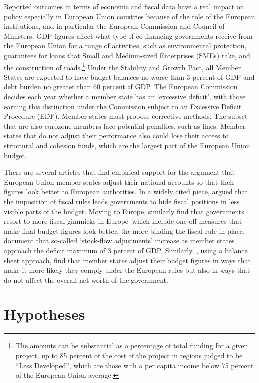 \documentclass[]{article}
\begin{document}
Reported outcomes in terms of economic and fiscal data have a real impact on policy especially in European Union countries because of the role of the European institutions, and in particular the European Commission and Council of Ministers. GDP figures affect what type of co-financing governments receive from the European Union for a range of activities, such as environmental protection, guarantees for loans that Small and Medium-sized Enterprises (SMEs) take, and the construction of roads.\footnote{The amounts can be substantial as a percentage of total funding for a given project, up to 85 percent of the cost of the project in regions judged to be “Less Developed”, which are those with a per capita income below 75 percent of the European Union average.} Under the Stability and Growth Pact, all Member States are expected to have budget balances no worse than 3 percent of GDP and debt burden no greater than 60 percent of GDP. The European Commission decides each year whether a member state has an `excessive deficit', with those earning this distinction under the Commission subject to an Excessive Deficit Procedure (EDP). Member states must propose corrective methods. The subset that are also eurozone members face potential penalties, such as fines. Member states that do not adjust their performance also could lose their access to structural and cohesion funds, which are the largest part of the European Union budget.

There are several articles that find empirical support for the argument that European Union member states adjust their national accounts so that their figures look better to European authorities.  In a widely cited piece, \cite{Milesi-Ferretti2003} argued that the imposition of fiscal rules leads governments to hide fiscal positions in less visible parts of the budget. Moving to Europe, \cite{KoenNoord2005} similarly find that governments resort to more fiscal gimmicks in Europe, which include one-off measures that make final budget figures look better, the more binding the fiscal rule in place. \cite{vonHagenWolff2006} document that so-called `stock-flow adjustments' increase as member states approach the  deficit maximum of 3 percent of GDP.  Similarly, \cite{MilesiMoriyama2006}, using a balance sheet approach, find that member states adjust their budget figures in ways that make it more likely they comply under the European rules but also in ways that do not affect the overall net worth of the government.

\section{Hypotheses}
\end{document}
